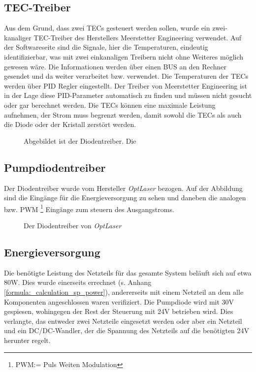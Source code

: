 \subsection{TEC-Treiber}
Aus dem Grund, dass zwei TECs gesteuert werden sollen, wurde ein zwei-kanaliger TEC-Treiber des Herstellers Meerstetter Engineering verwendet. Auf der Softwareseite sind die Signale, hier die Temperaturen, eindeutig identifizierbar, was mit zwei einkanaligen Treibern nicht ohne Weiteres möglich gewesen wäre. Die Informationen werden über einen BUS an den Rechner gesendet und da weiter verarbeitet bzw. verwendet.
Die Temperaturen der TECs werden über PID Regler eingestellt. Der Treiber von Meerstetter Engineering ist in der Lage diese PID-Parameter automatisch zu finden und müssen nicht gesucht oder gar berechnet werden. Die TECs können eine maximale Leistung aufnehmen, der Strom muss begrenzt werden, damit sowohl die TECs als auch die Diode oder der Kristall zerstört werden.

\begin{figure}
    \centering
    \caption{Abgebildet ist der Diodentreiber. Die}
    \label{fig:tec_treiber_hw}
\end{figure}

\subsection{Pumpdiodentreiber}
Der Diodentreiber wurde vom Hersteller \textit{OptLaser} bezogen. Auf der Abbildung sind die Eingänge für die Energieversorgung zu sehen und daneben die analogen bzw. PWM \footnote{PWM:= Puls Weiten Modulation} Eingänge zum steuern des Ausgangstroms.

\begin{figure}
    \centering
    \caption{Der Diodentreiber von \textit{OptLaser}}
    \label{fig:diodentreiber_hw}
\end{figure}

\subsection{Energieversorgung}
Die benötigte Leistung des Netzteils für das gesamte System beläuft sich auf etwa 80W.
Dies wurde einerseits errechnet (s. Anhang \ref{formula:_calculation_sp_power}), andererseits mit einem Netzteil an dem alle Komponenten angeschlossen waren verifiziert. Die Pumpdiode wird mit 30V gespiesen, wohingegen der Rest der Steuerung mit 24V betrieben wird. Dies verlangte, das entweder zwei Netzteile eingesetzt werden oder aber ein Netzteil und ein DC/DC-Wandler, der die Spannung des Netzteils auf die benötigten 24V herunter regelt.

